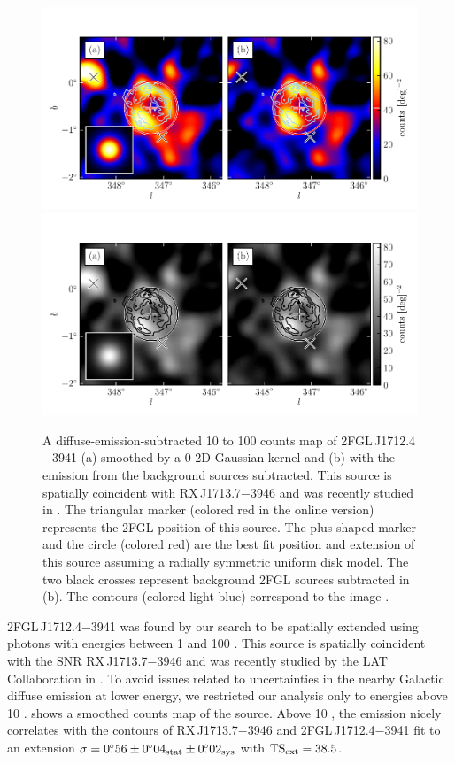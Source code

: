 \begin{figure}[htbp]
    \ifcolorfigure
      \includegraphics{source_plots/source_RX_J1713d7-3946_color.pdf}
    \else
      \includegraphics{source_plots/source_RX_J1713d7-3946_bw.pdf}
    \fi
  \caption{
  A diffuse-emission-subtracted 10 \gev to 100 \gev counts map
  of 2FGL\,J1712.4$-$3941 (a) smoothed by a 0 2D
  Gaussian kernel and (b) with the emission from the background sources
  subtracted.  This source is spatially coincident with RX\,J1713.7$-$3946
  and was recently studied in \cite{abdo_2011a_observations-young}.  The triangular marker
  (colored red in the online version) represents the 2FGL position of
  this source.  The plus-shaped marker and the circle (colored red) are
  the best fit position and extension of this source assuming a radially
  symmetric uniform disk model.  
  The two black crosses represent background 2FGL sources subtracted in (b).
  The contours (colored light blue)
  correspond to the \tev image \citep{aharonian_2007a_primary-particle}.  
  }
\end{figure}


2FGL\,J1712.4$-$3941 was found by our search to be spatially extended
using photons with energies between 1 \gev and 100 \gev.  This source
is spatially coincident with the SNR RX\,J1713.7$-$3946 and was
recently studied by the LAT Collaboration in \cite{abdo_2011a_observations-young}.
To avoid issues related to uncertainties in the nearby Galactic
diffuse emission at lower energy, we restricted our analysis only
to energies above 10 \gev.   shows a
smoothed counts map of the source. Above 10 \gev, the \gev emission
nicely correlates with the \tev contours of RX\,J1713.7$-$3946
\citep{aharonian_2007a_primary-particle} and 2FGL\,J1712.4$-$3941 fit to an extension 
$\sigma=0\mbox{$.\!\!^\circ$}56\pm0\mbox{$.\!\!^\circ$}04_\text{stat}\pm0\mbox{$.\!\!^\circ$}02_\text{sys}$ with $\mathrm{TS}_\mathrm{ext}=38.5$.


